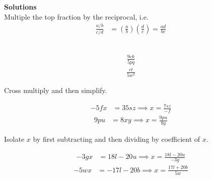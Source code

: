 \documentclass[letterpaper, 11pt]{article}
\begin{document}
\pagebreak 
{ \bf \Large Solutions } \\ 
 

Multiple the top fraction by the reciprocal, i.e. 
\begin{align}
\frac{ a / b } { c / d } &= \left( \frac{a}{b}  \right)  \left( \frac{d}{c} \right)  = \frac{ a d } { b c }  \nonumber 
\end{align} 
 \\ 
\begin{multicols}{ 3 }
\begin{align} 
\frac{ 9ck  } { 5pq  }  \nonumber 
\end{align} 
\begin{align} 
\frac{ rt  } { 5w^2  }  \nonumber 
\end{align} 
\end{multicols}

 Cross multiply and then simplify. \\ 
\begin{multicols}{ 3 }
\begin{align} 
 -5fx &= 35sz \implies x = \frac{ 7sz } {  -f }   \nonumber  
\end{align} 
\begin{align} 
9pu &= 8xy \implies x = \frac{ 9pu } { 8y }   \nonumber  
\end{align} 
\end{multicols}

 Isolate $x$ by first subtracting and then dividing by coefficient of $x$. \\ 
\begin{multicols}{ 2 }
\begin{align} 
 -3gx &= 18l -20u \implies x = \frac{ 18l -20u } {  -3g }   \nonumber  
\end{align} 
\begin{align} 
 -5wx &=  -17l -20b \implies x = \frac{ 17l +20b } { 5w }   \nonumber  
\end{align} 
\end{multicols}
\end{document}
